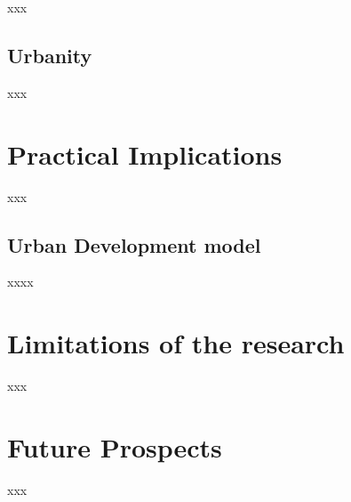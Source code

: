 \documentclass[11pt]{report}
\begin{document}
xxx

\subsection{Urbanity}

xxx

\section{Practical Implications}

xxx

\subsection{Urban Development model}

xxxx

\section{Limitations of the research}

xxx

\section{Future Prospects}

xxx



\begin{small}

\end{small}



\newpage
\appendix
\noappendicestocpagenum
\addappheadtotoc
\end{document}
